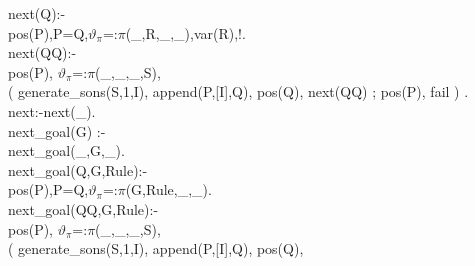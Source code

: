\documentclass[11pt]{report}
\makeatletter
\newcommand{\ulinv}[1]{\index{#1@\texttt{#1}}}
\makeatother
\begin{document}
\begin{itemize}
 \ulinv{next}
\begin{sf}\begin{tabbing}
next(Q):-\\[-0.15ex]
\hspace{2em}pos(P),P=Q,$\vartheta_{\pi}$=:$\pi$(\_\hspace{0.1em},R,\_\hspace{0.1em},\_\hspace{0.1em}),var(R),!.\\[-0.15ex]
next(QQ):-\\[-0.15ex]
\hspace{2em}pos(P), $\vartheta_{\pi}$=:$\pi$(\_\hspace{0.1em},\_\hspace{0.1em},\_\hspace{0.1em},S),\\[-0.15ex]
\hspace{2em}( generate\_\hspace{0.1em}sons(S,1,I), append(P,[I],Q), pos(Q), next(QQ) ; pos(P), fail ) .  \\[-0.15ex]
next:-next(\_\hspace{0.1em}).\\[-0.15ex]
next\_\hspace{0.1em}goal(G) :-\\[-0.15ex]
\hspace{2em}next\_\hspace{0.1em}goal(\_\hspace{0.1em},G,\_\hspace{0.1em}).\\[-0.15ex]
next\_\hspace{0.1em}goal(Q,G,Rule):-\\[-0.15ex]
\hspace{2em}pos(P),P=Q,$\vartheta_{\pi}$=:$\pi$(G,Rule,\_\hspace{0.1em},\_\hspace{0.1em}).\\[-0.15ex]
next\_\hspace{0.1em}goal(QQ,G,Rule):-\\[-0.15ex]
\hspace{2em}pos(P), $\vartheta_{\pi}$=:$\pi$(\_\hspace{0.1em},\_\hspace{0.1em},\_\hspace{0.1em},S),\\[-0.15ex]
\hspace{2em}( generate\_\hspace{0.1em}sons(S,1,I), append(P,[I],Q), pos(Q),\\[-0.15ex]

\end{tabbing}
\end{sf}
\end{itemize}
\end{document}
